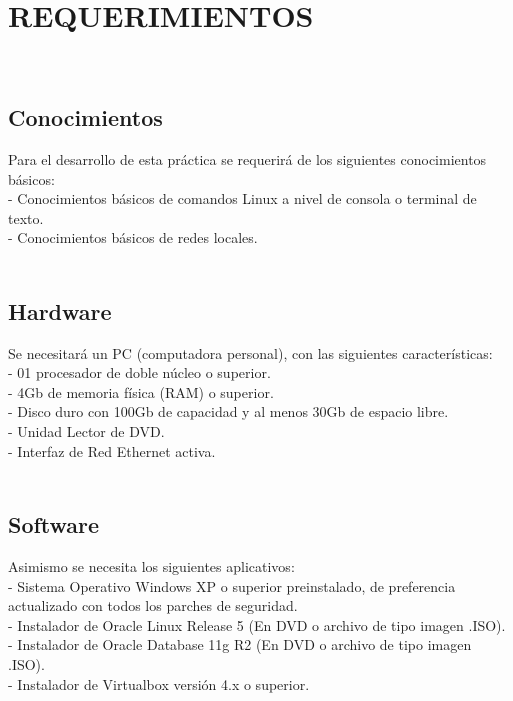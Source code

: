 \section{REQUERIMIENTOS}
\begin{enumerate}
\vspace{12pt}\\

\subsection{Conocimientos}
Para el desarrollo de esta práctica se requerirá de los siguientes conocimientos básicos:\\
- Conocimientos básicos de comandos Linux a nivel de consola o terminal de texto.\\
- Conocimientos básicos de redes locales.\\

\vspace{12pt}\\
\subsection{Hardware}
Se necesitará un PC (computadora personal), con las siguientes características:\\
- 01 procesador de doble núcleo o superior.\\
- 4Gb de memoria física (RAM) o superior.\\
- Disco duro con 100Gb de capacidad y al menos 30Gb de espacio libre.\\
- Unidad Lector de DVD.\\
- Interfaz de Red Ethernet activa.\\

\vspace{12pt}\\
\subsection{Software}
Asimismo se necesita los siguientes aplicativos:\\
- Sistema Operativo Windows XP o superior preinstalado, de preferencia actualizado con todos los parches de seguridad.\\
- Instalador de Oracle Linux Release 5 (En DVD o archivo de tipo imagen .ISO).\\
- Instalador de Oracle Database 11g R2 (En DVD o archivo de tipo imagen .ISO).\\
- Instalador de Virtualbox versión 4.x o superior.\\


\end{enumerate}
